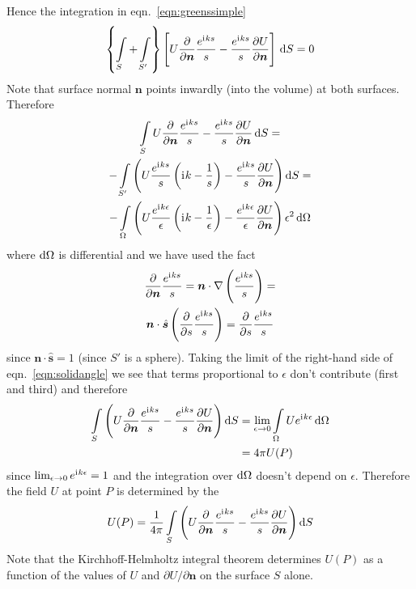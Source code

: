 Hence the integration in eqn.~\eqref{eqn:greenssimple}
%
\begin{equation}
    \left\{ \int\limits_{S} + \int\limits_{S'} \right\} \left[U \pdv{}{\bm{n}} \frac{e^{\iu k s}}{s} - \frac{e^{\iu k s}}{s} \pdv{U}{\bm{n}}\right]\,\dif S = 0
\end{equation}
%
Note that surface normal \(\bm{n}\) points inwardly (into the volume) at both surfaces.
%
Therefore
%
\begin{multline}
    \int\limits_{S} U \pdv{}{\bm{n}} \frac{e^{\iu k s}}{s} - \frac{e^{\iu k s}}{s} \pdv{U}{\bm{n}} \dif S = \\
    - \int\limits_{S'} \left( U \frac{e^{\iu k s}}{s} \left( \iu k  - \frac{1}{s} \right) - \frac{e^{\iu k s}}{s} \pdv{U}{\bm{n}} \right) \dif S = \\
    - \int\limits_{\Omega} \left( U \frac{e^{\iu k \epsilon}}{\epsilon} \left( \iu k  - \frac{1}{\epsilon} \right) - \frac{e^{\iu k \epsilon}}{\epsilon} \pdv{U}{\bm{n}} \right)\epsilon^2 \dif \Omega \label{eqn:solidangle}
\end{multline}
%
where \(\dif \Omega\) is differential  and we have used the fact
%
\begin{multline}
    \pdv{}{\bm{n}} \frac{e^{\mathrm{i}\mkern1mu k s}}{s} = \bm{n}\cdot \nabla \left( \frac{e^{\mathrm{i}\mkern1mu k s}}{s} \right) = \\ \bm{n} \cdot \hat{\bm{s}} \left( \pdv{}{s} \frac{e^{\mathrm{i}\mkern1mu k s}}{s}\right) =  \pdv{}{s} \frac{e^{\mathrm{i}\mkern1mu k s}}{s}
\end{multline}
%
since \(\bm{n} \cdot \hat{\bm{s}} = 1\) (since \(S'\) is a sphere).
%
Taking the limit of the right-hand side of eqn.~\eqref{eqn:solidangle} we see that terms proportional to \(\epsilon\) don't contribute (first and third) and therefore
%
\begin{align}
    \int\limits_{S} \left( U \pdv{}{\bm{n}} \frac{e^{\iu k s}}{s} - \frac{e^{\iu k s}}{s} \pdv{U}{\bm{n}} \right) \dif S & = \lim_{\epsilon \rightarrow 0} \int\limits_{\Omega} U e^{\iu k \epsilon} \dif \Omega \\
                                                                                                          & = 4 \pi U(P)
\end{align}
%
since \(\lim_{\epsilon \rightarrow 0} e^{\mathrm{i}\mkern1mu k \epsilon} = 1\) and the integration over \(\dif \Omega\) doesn't depend on \(\epsilon\).
%
Therefore the field \(U\) at point \(P\) is determined by the 
%
\begin{equation}
    U(P) = \frac{1}{4 \pi}\int\limits_{S} \left( U \pdv{}{\bm{n}} \frac{e^{\iu k s}}{s} - \frac{e^{\iu k s}}{s} \pdv{U}{\bm{n}} \right) \dif S \label{eqn:kirchoffhelmintegral}
\end{equation}
%
Note that the Kirchhoff-Helmholtz integral theorem determines \(U(P)\) as a function of the values of \(U\) and \(\partial U / \partial \bm{n}\) on the surface \(S\) alone.

